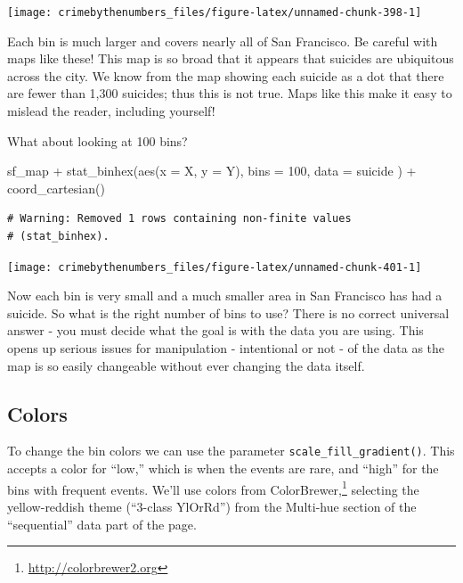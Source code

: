 \documentclass[
  a4paper,
]{krantz}
\makeatletter
\newenvironment{Shaded}{\begin{snugshade}}{\end{snugshade}}
\newcommand{\AttributeTok}[1]{\textcolor[rgb]{0.61,0.61,0.61}{#1}}
\newcommand{\DecValTok}[1]{\textcolor[rgb]{0.06,0.06,0.06}{#1}}
\newcommand{\FunctionTok}[1]{\textcolor[rgb]{0,0,0}{#1}}
\newcommand{\NormalTok}[1]{#1}
\newcommand{\SpecialCharTok}[1]{\textcolor[rgb]{0,0,0}{#1}}
\renewcommand{\href}[2]{#2\footnote{\url{#1}}}
\newenvironment{kframe}{%
\medskip{}
\setlength{\fboxsep}{.8em}
 \def\at@end@of@kframe{}%
 \ifinner\ifhmode%
  \def\at@end@of@kframe{\end{minipage}}%
  \begin{minipage}{\columnwidth}%
 \fi\fi%
 \def\FrameCommand##1{\hskip\@totalleftmargin \hskip-\fboxsep
 \colorbox{shadecolor}{##1}\hskip-\fboxsep
     \hskip-\linewidth \hskip-\@totalleftmargin \hskip\columnwidth}%
 \MakeFramed {\advance\hsize-\width
   \@totalleftmargin\z@ \linewidth\hsize
   \@setminipage}}%
 {\par\unskip\endMakeFramed%
 \at@end@of@kframe}
\renewenvironment{Shaded}{\begin{kframe}}{\end{kframe}}
\makeatother
\begin{document}
\begin{center}\texttt{[image: crimebythenumbers\_files/figure-latex/unnamed-chunk-398-1]} \end{center}

Each bin is much larger and covers nearly all of San
Francisco. Be careful with maps like these! This map is so
broad that it appears that suicides are ubiquitous across
the city. We know from the map showing each suicide as a dot
that there are fewer than 1,300 suicides; thus this is not
true. Maps like this make it easy to mislead the reader,
including yourself!

What about looking at 100 bins?

\begin{Shaded}
\begin{Highlighting}[]
\NormalTok{sf\_map }\SpecialCharTok{+}
  \FunctionTok{stat\_binhex}\NormalTok{(}\FunctionTok{aes}\NormalTok{(}\AttributeTok{x =}\NormalTok{ X, }\AttributeTok{y =}\NormalTok{ Y),}
    \AttributeTok{bins =} \DecValTok{100}\NormalTok{,}
    \AttributeTok{data =}\NormalTok{ suicide}
\NormalTok{  ) }\SpecialCharTok{+}
  \FunctionTok{coord\_cartesian}\NormalTok{()}
\end{Highlighting}
\end{Shaded}

\begin{verbatim}
# Warning: Removed 1 rows containing non-finite values
# (stat_binhex).
\end{verbatim}

\begin{center}\texttt{[image: crimebythenumbers\_files/figure-latex/unnamed-chunk-401-1]} \end{center}

Now each bin is very small and a much smaller area in San
Francisco has had a suicide. So what is the right number of
bins to use? There is no correct universal answer - you must
decide what the goal is with the data you are using. This
opens up serious issues for manipulation - intentional or
not - of the data as the map is so easily changeable without
ever changing the data itself.

\hypertarget{colors}{%
\subsection{Colors}\label{colors}}

To change the bin colors we can use the parameter
\texttt{scale\_fill\_gradient()}. This accepts a color for
``low,'' which is when the events are rare, and ``high'' for
the bins with frequent events. We'll use colors from
\href{http://colorbrewer2.org}{ColorBrewer,} selecting the
yellow-reddish theme (``3-class YlOrRd'') from the Multi-hue
section of the ``sequential'' data part of the page.
\end{document}
